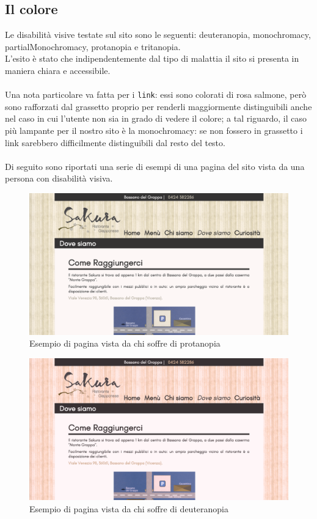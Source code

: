 \documentclass[../relazione.tex]{subfiles}
\begin{document}
	\subsection{Il colore}
		Le disabilità visive testate sul sito sono le seguenti: deuteranopia, monochromacy, partialMonochromacy, protanopia e tritanopia.\\
		L'esito è stato che indipendentemente dal tipo di malattia il sito si presenta in maniera chiara e accessibile.\\\\
		Una nota particolare va fatta per i \texttt{link}: essi sono colorati di rosa salmone, però sono rafforzati dal grassetto proprio per renderli maggiormente distinguibili anche nel caso in cui l'utente non sia in grado di vedere il colore; a tal riguardo, il caso più lampante per il nostro sito è la monochromacy: se non fossero in grassetto i link sarebbero difficilmente distinguibili dal resto del testo.\\\\
		Di seguito sono riportati una serie di esempi di una pagina del sito vista da una persona con disabilità visiva.
	\begin{figure}[H]
	\centering
		\includegraphics[width=\textwidth]{images/colorblindness/protanopia}
		\caption{Esempio di pagina vista da chi soffre di protanopia}
		\label{fig:Esempio di pagina vista da chi soffre di protanopia}
	\end{figure}
	\begin{figure}[H]
	\centering
		\includegraphics[width=\textwidth]{images/colorblindness/deuteranopia}
		\caption{Esempio di pagina vista da chi soffre di deuteranopia}
		\label{fig:Esempio di pagina vista da chi soffre di deuteranopia}
	\end{figure}
\end{document}
